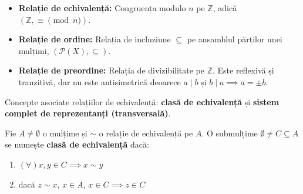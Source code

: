 \begin{example}\leavevmode
\begin{itemize}
    \item \textbf{Relație de echivalență:} Congruența modulo $n$ pe $\mathbb{Z}$, adică $(\mathbb{Z}, \equiv \pmod n)$.
    \item \textbf{Relație de ordine:} Relația de incluziune $\subseteq$ pe ansamblul părților unei mulțimi, $(\mathcal{P}(X), \subseteq)$.
    \item \textbf{Relație de preordine:} Relația de divizibilitate pe $\mathbb{Z}$. Este reflexivă și tranzitivă, dar nu este antisimetrică deoarece $a \mid b$ și $b \mid a \implies a = \pm b$.
\end{itemize}
\end{example}

\vspace{1em}
Concepte asociate relațiilor de echivalență: \textbf{clasă de echivalență} și \textbf{sistem complet de reprezentanți (transversală)}.

\begin{definition}
Fie $A \neq \emptyset$ o mulțime și $\sim$  o relație de echivalență pe $A$. O submulțime $\emptyset \neq C \subseteq A$ se numește \textbf{clasă de echivalență} dacă:
\begin{enumerate}
    \item $(\forall) x, y \in C \implies x \sim y$
    \item dacă $z \sim x$, $x \in A$, $x \in C \implies z \in C$
\end{enumerate}
\end{definition}


